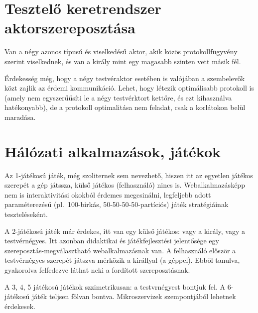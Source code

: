 \documentclass{article}
\begin{document}
\begin{comment}
	\subsection{Szabályok}

	\subsection{Rekurziós gráf}

	Szintezettség, hasonló a táblázathoz, de az indeterminisztikus komplementaritás miatt az élek kuszák a szintek között.

	\end{comment}

	\section{Tesztelő keretrendszer aktorszereposztása}

	Van a négy azonos típusú és viselkedésű aktor, akik közös protokollfügyvény szerint viselkednek, és van a király mint egy magasabb szinten vett másik fél.

	Érdekesség még, hogy a négy testvéraktor esetében is valójában a szembelevők közt zajlik az érdemi kommunikáció. Lehet, hogy létezik optimálisabb protokoll is (amely nem egyszerűűsíti le a négy testvérktort kettőre, és ezt kihasználva hatékonyabb), de a protokoll optimalitása nem feladat, csak a korlátokon belül maradása.

	\section{Hálózati alkalmazások, játékok}

	Az 1-játékosú játék, még szoliternek sem nevezhető, hiszen itt az egyetlen játékos szerepét a gép játssza, külső játékos (felhasználó) nincs is. Webalkalmazásképp nem is interaktivitási okokból érdemes megcsinálni, legfeljebb adott paraméterezésű (pl.~100-birkás, 50-50-50-50-partíciós) játék stratégiáinak teszteléseként.

	A 2-játékosú játék már érdekes, itt van egy külső játékos: vagy a király, vagy a testvérnégyes. Itt azonban didaktikai és játékfejlesztési jelentősége egy szereposztás-megválasztható webalkalmazásnak van. A felhasználó először a testvérnégyes szerepét játszva mérközik a királlyal (a géppel). Ebből tanulva, gyakorolva felfedezve láthat neki a fordított szereposztásnak.

	A 3, 4, 5 játékosú játékok szzimetrikusan: a testvrnégyest bontjuk fel. A 6-játékosú játék teljsen fölvan bontva. Mikroszervizek szempontjából lehetnek érdekesek.
\end{document}
